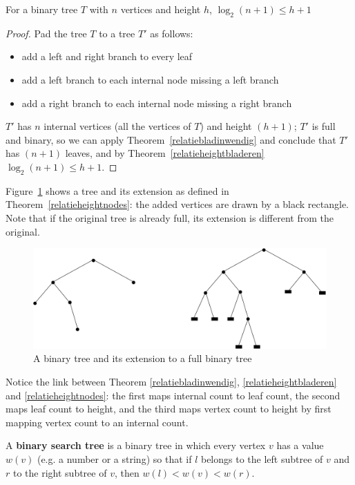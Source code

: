 \begin{theorem}
	For a binary tree $T$ with $n$ vertices and
	height $h$, $\log_2(n+1) \leq h+1$
	\label{relatieheightnodes}
\end{theorem}
\begin{proof}
Pad the tree $T$ to a tree $T'$ as follows:
\begin{itemize}
	\item add a left and right branch to every leaf
	\item add a left branch to each internal node missing a left branch
	\item add a right branch to each internal node missing a right branch
\end{itemize}

$T'$ has $n$ internal vertices (all the vertices of $T$) and height
$(h+1)$; $T'$ is full and binary, so we can apply
Theorem~\ref{relatiebladinwendig} and conclude that $T'$ has
$(n+1)$ leaves, and by Theorem~\ref{relatieheightbladeren} $\log_2(n+1)
\leq h+1$.
\end{proof}

Figure~\ref{uitbreiding1} shows a tree and its extension as defined in
Theorem~\ref{relatieheightnodes}: the added vertices are drawn by a
black rectangle. Note that if the original tree is already full, its
extension is different from the original.

\begin{figure}[ht]
	\centering
	\includegraphics[width=0.6\linewidth,keepaspectratio]{uitbreiding1}
	\caption{A binary tree and its extension to a full binary tree\label{uitbreiding1}}
\end{figure}

Notice the link between Theorem \ref{relatiebladinwendig}, \ref{relatieheightbladeren} and \ref{relatieheightnodes}: the first maps internal count to leaf count, the second maps leaf count to height, and the third maps vertex count to height by first mapping vertex count to an internal count.

\begin{definition}
	\textup{A \textbf{binary search tree} is a binary tree in which every
	vertex $v$ has a value $w(v)$ (e.g. a number or a string) so that
	if $l$ belongs to the left subtree of $v$ and $r$ to the right subtree
	of $v$, then  $w(l) < w(v) < w(r)$. }
\end{definition}


